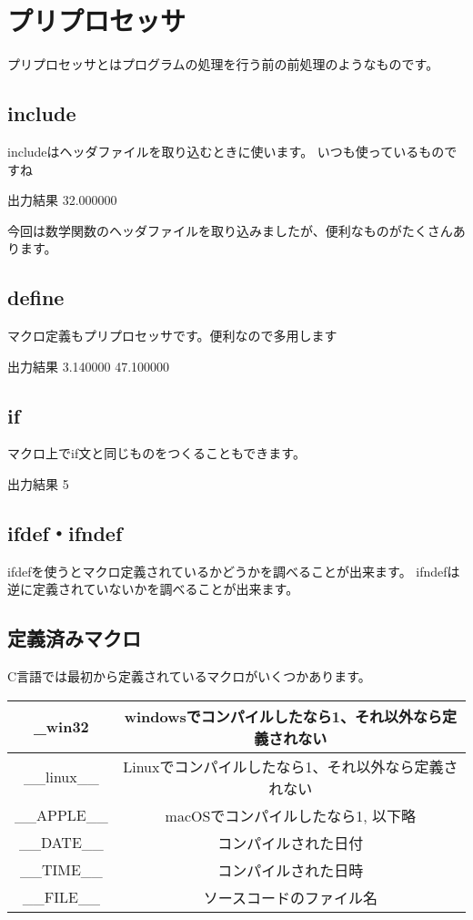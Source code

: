 \section{プリプロセッサ}
プリプロセッサとはプログラムの処理を行う前の前処理のようなものです。
\subsection{include}
includeはヘッダファイルを取り込むときに使います。
いつも使っているものですね

\begin{itembox}{出力結果}
32.000000
\end{itembox}
今回は数学関数のヘッダファイルを取り込みましたが、便利なものがたくさんあります。
\subsection{define}
マクロ定義もプリプロセッサです。便利なので多用します




\begin{itembox}{出力結果}
3.140000
47.100000
\end{itembox}
\subsection{if}
マクロ上でif文と同じものをつくることもできます。

\begin{itembox}{出力結果}
5
\end{itembox}

\subsection{ifdef・ifndef}
ifdefを使うとマクロ定義されているかどうかを調べることが出来ます。
ifndefは逆に定義されていないかを調べることが出来ます。

\subsection{定義済みマクロ}
C言語では最初から定義されているマクロがいくつかあります。

\begin{table}[htb]
\begin{center}
\begin{tabular}{|c|c|}

\hline
\_win32 & windowsでコンパイルしたなら1、それ以外なら定義されない\\ \hline
\_\_linux\_\_ & Linuxでコンパイルしたなら1、それ以外なら定義されない \\ \hline
\_\_APPLE\_\_ & macOSでコンパイルしたなら1, 以下略 \\ \hline
\_\_DATE\_\_ &コンパイルされた日付 \\ \hline
\_\_TIME\_\_ &コンパイルされた日時 \\ \hline
\_\_FILE\_\_ &ソースコードのファイル名 \\
\hline

\end{tabular}
\end{center}
\end{table}


